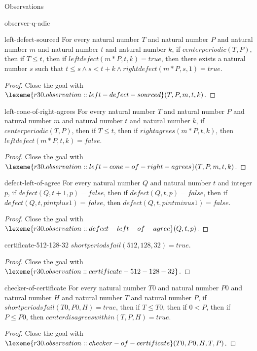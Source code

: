 \begin{lexlean}{Observations}
\begin{section}{observer-q-adic}
\begin{theorem}{left-defect-sourced}
For every natural number \(T\) and natural number \(P\) and natural number \(m\) and natural number \(t\) and natural number \(k\), if \(centerperiodic(T, P)\), then if \(T ≤ t\), then if \(leftdefect(m * P, t, k) = true\), then there exists a natural number \(s\) such that \(t ≤ s ∧ s < t + k ∧ rightdefect(m * P, s, 1) = true\).
\begin{proof}
Close the goal with \(\lexeme{r30.observation::left-defect-sourced}(T, P, m, t, k)\).
\end{proof}
\end{theorem}

\begin{theorem}{left-cone-of-right-agrees}
For every natural number \(T\) and natural number \(P\) and natural number \(m\) and natural number \(t\) and natural number \(k\), if \(centerperiodic(T, P)\), then if \(T ≤ t\), then if \(rightagrees(m * P, t, k)\), then \(leftdefect(m * P, t, k) = false\).
\begin{proof}
Close the goal with \(\lexeme{r30.observation::left-cone-of-right-agrees}(T, P, m, t, k)\).
\end{proof}
\end{theorem}

\begin{theorem}{defect-left-of-agree}
For every natural number \(Q\) and natural number \(t\) and integer \(p\), if \(defect(Q, t + 1, p) = false\), then if \(defect(Q, t, p) = false\), then if \(defect(Q, t, p intplus 1) = false\), then \(defect(Q, t, p intminus 1) = false\).
\begin{proof}
Close the goal with \(\lexeme{r30.observation::defect-left-of-agree}(Q, t, p)\).
\end{proof}
\end{theorem}

\begin{theorem}{certificate-512-128-32}
\(shortperiodsfail(512, 128, 32) = true\).
\begin{proof}
Close the goal with \(\lexeme{r30.observation::certificate-512-128-32}\).
\end{proof}
\end{theorem}

\begin{theorem}{checker-of-certificate}
For every natural number \(T0\) and natural number \(P0\) and natural number \(H\) and natural number \(T\) and natural number \(P\), if \(shortperiodsfail(T0, P0, H) = true\), then if \(T ≤ T0\), then if \(0 < P\), then if \(P ≤ P0\), then \(centerdisagreeswithin(T, P, H) = true\).
\begin{proof}
Close the goal with \(\lexeme{r30.observation::checker-of-certificate}(T0, P0, H, T, P)\).
\end{proof}
\end{theorem}


\end{section}
\end{lexlean}
